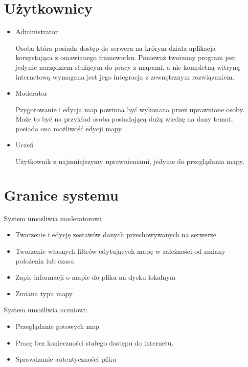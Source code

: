 \section{Użytkownicy}
\label{sec:uzytkownicy}

\begin{itemize}
\item
Administrator

Osoba która posiada dostęp do serwera na krórym działa aplikacja korzystająca z omawianego frameworku. Ponieważ tworzony program jest jedynie narzędziem służącym do pracy z mapami, a nie kompletną witryną internetową wymagana jest jego integracja z zewnętrznym rozwiązaniem.

\item
Moderator

Pzygotowanie i edycja map powinna być wykonana przez uprawnione osoby. Może to być na przykład osoba posiadającą dużą wiedzę na dany temat, posiada ona możliwość edycji mapy.
\item
Uczeń

Użytkownik z najmniejszymy uprawnieniami, jedynie do przeglądania mapy.
\end{itemize}

\section{Granice systemu}
\label{sec:granicesystemu}

System umożliwia moderatorowi:
\begin{itemize}
\item
Tworzenie i edycję zestawów danych przechowywanych na serwerze

\item
Tworzenie własnych filtrów edytujących mapę w zależności od zmiany położenia lub czasu

\item
Zapis informacji o mapie do pliku na dysku lokalnym

\item
Zmiana typu mapy

\end{itemize}

System umożliwia uczniowi:
\begin{itemize}
\item
Przeglądanie gotowych map

\item
Pracę bez konieczności stałego dostępu do internetu.

\item
Sprawdzanie autentyczności pliku

\end{itemize}

